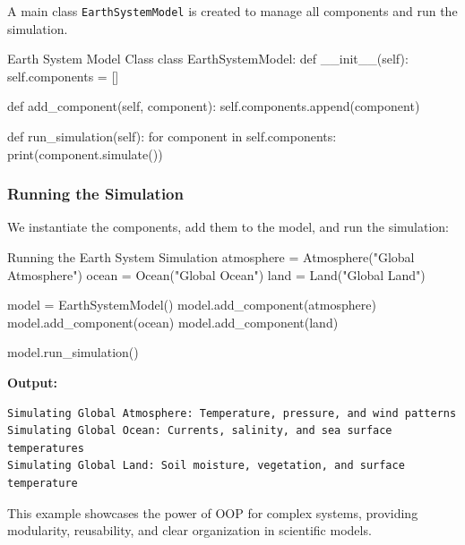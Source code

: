 A main class \texttt{EarthSystemModel} is created to manage all components and run the simulation.

\begin{codeonly}{Earth System Model Class}
class EarthSystemModel:
    def __init__(self):
        self.components = []

    def add_component(self, component):
        self.components.append(component)

    def run_simulation(self):
        for component in self.components:
            print(component.simulate())
\end{codeonly}

%
\subsubsection{Running the Simulation}

We instantiate the components, add them to the model, and run the simulation:

\begin{codeonly}{Running the Earth System Simulation}
atmosphere = Atmosphere("Global Atmosphere")
ocean = Ocean("Global Ocean")
land = Land("Global Land")

model = EarthSystemModel()
model.add_component(atmosphere)
model.add_component(ocean)
model.add_component(land)

model.run_simulation()
\end{codeonly}

\textbf{Output:}
\begin{verbatim}
Simulating Global Atmosphere: Temperature, pressure, and wind patterns
Simulating Global Ocean: Currents, salinity, and sea surface temperatures
Simulating Global Land: Soil moisture, vegetation, and surface temperature
\end{verbatim}

This example showcases the power of OOP for complex systems, providing modularity, reusability, and clear organization in scientific models.

